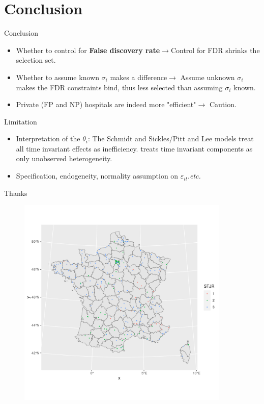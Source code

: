 \documentclass[10pt,mathserif,aspectratio=169]{beamer}
\begin{document}
\section{Conclusion}

\begin{frame}{Conclusion}
  \begin{itemize}
    \item Whether to control for \textbf{False discovery rate}$\to$Control for FDR
          shrinks the selection set.
    \item Whether to assume known $\sigma_i$ makes a difference$\to$ Assume unknown
          $\sigma_i$ makes the FDR constraints bind, thus less selected than assuming
          $\sigma_i$ known.
    \item Private (FP and NP) hospitals are indeed more "efficient"$\to$ Caution.
  \end{itemize}
\end{frame}

\begin{frame}[label=limitation]{Limitation}
  \begin{itemize}\itemsep=12pt
    \item Interpretation of the $\theta_i$: The Schmidt and Sickles/Pitt and Lee models
          treat all time invariant effects as inefficiency. \citet{greene2005fixed}
          treats time invariant components as only unobserved heterogeneity.
    \item Specification, endogeneity, normality assumption on
          $\varepsilon_{it}$.\textit{etc.} \hyperlink{normality}{} \end{itemize}
\end{frame}

\begin{frame}{Thanks}
  \begin{figure}
    \centering
    \includegraphics[width=0.9\textwidth]{../../Figures/2013-2022/Maps/Map.pdf}
  \end{figure}
\end{frame}
\end{document}
